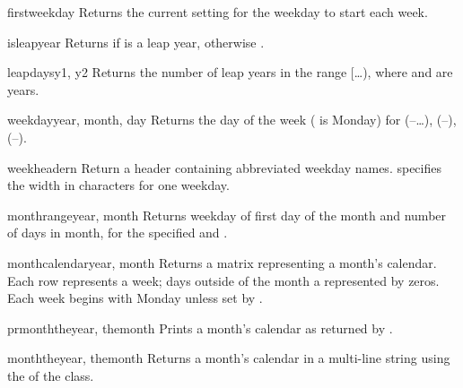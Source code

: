 \begin{funcdesc}{firstweekday}{}
Returns the current setting for the weekday to start each week.
\end{funcdesc}

\begin{funcdesc}{isleap}{year}
Returns  if  is a leap year, otherwise
.
\end{funcdesc}

\begin{funcdesc}{leapdays}{y1, y2}
Returns the number of leap years in the range
[\ldots{}), where  and  are years.
\end{funcdesc}

\begin{funcdesc}{weekday}{year, month, day}
Returns the day of the week ( is Monday) for 
(--\ldots),  (--), 
(--).
\end{funcdesc}

\begin{funcdesc}{weekheader}{n}
Return a header containing abbreviated weekday names.  specifies
the width in characters for one weekday.
\end{funcdesc}

\begin{funcdesc}{monthrange}{year, month}
Returns weekday of first day of the month and number of days in month, 
for the specified  and .
\end{funcdesc}

\begin{funcdesc}{monthcalendar}{year, month}
Returns a matrix representing a month's calendar.  Each row represents
a week; days outside of the month a represented by zeros.
Each week begins with Monday unless set by .
\end{funcdesc}

\begin{funcdesc}{prmonth}{theyear, themonth}
Prints a month's calendar as returned by .
\end{funcdesc}

\begin{funcdesc}{month}{theyear, themonth}
Returns a month's calendar in a multi-line string using the
 of the  class.
\end{funcdesc}

